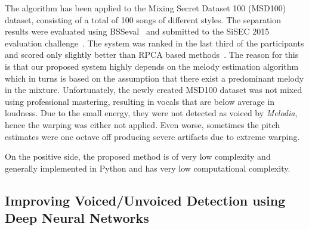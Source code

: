 The algorithm has been applied to the Mixing Secret Dataset 100 (MSD100) dataset,  consisting of a total of 100 songs of different styles.
The separation results were evaluated using BSSeval~\cite{todo} and submitted to the SiSEC 2015 evaluation challenge~\cite{ono15}.
The system was ranked in the last third of the participants and scored only slightly better than RPCA based methods~\cite{huang12}.
The reason for this is that our proposed system highly depends on the melody estimation algorithm which in turns is based on the assumption that there exist a predominant melody in the mixture.
Unfortunately, the newly created MSD100 dataset was not mixed using professional mastering, resulting in vocals that are below average in loudness.
Due to the small energy, they were not detected as voiced by \emph{Melodia}, hence the warping was either not applied. Even worse, sometimes the pitch estimates were one octave off producing severe artifacts due to extreme warping.\par
On the positive side, the proposed method is of very low complexity and generally implemented in Python and has very low computational complexity.

\subsection{Improving Voiced/Unvoiced Detection using Deep Neural Networks}

